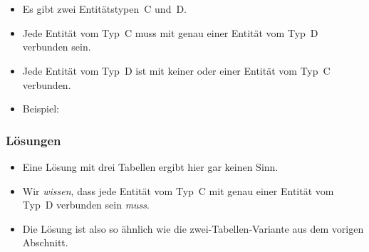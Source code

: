 %
\section{}%
%
\begin{frame}[t]%
\frametitle{}%
\begin{itemize}%
\item Es gibt zwei Entitätstypen~C und~D.%
\item<2-> Jede Entität vom Typ~C muss mit genau einer Entität vom Typ~D verbunden sein.
\item<3-> Jede Entität vom Typ~D ist mit keiner oder einer Entität vom Typ~C verbunden.
\item<4-> Beispiel:%
\end{itemize}%
%
%
\end{frame}%
%
\begin{frame}%
\frametitle{Lösungen}%
\begin{itemize}%
\item Eine Lösung mit drei Tabellen ergibt hier gar keinen Sinn.%
%
\item<2-> Wir \emph{wissen}, dass jede Entität vom Typ~C mit genau einer Entität vom Typ~D verbunden sein \emph{muss}.%
%
\item<3-> Die Lösung ist also so ähnlich wie die zwei-Tabellen-Variante aus dem vorigen Abschnitt.%
\end{itemize}%
\end{frame}%
%
